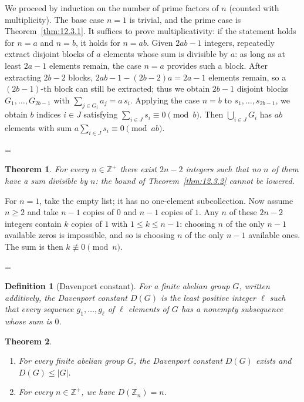 \documentclass[11pt]{article}
\makeatletter
\theoremstyle{ntstyle}
\newtheorem{theorem}{Theorem}[subsection]
\newtheorem{definition}{Definition}[subsection]
\newcommand{\statementitems}{\mbox{}}
\let\nt@closedisplay\]
\def\nt@guardedclose{\@ifnextchar\par{\nt@closeafterpar}{\@ifnextchar\end{\postdisplaypenalty\@M\nt@closedisplay}{\nt@closedisplay}}}
\def\nt@closeafterpar\par{\@ifnextchar\par{\nt@closeafterpar}{\@ifnextchar\end{\postdisplaypenalty\@M\nt@closedisplay\par}{\nt@closedisplay\par}}}
\renewenvironment{proof}[1][\proofname]{\par
  \pushQED{\qed}\normalfont\topsep\medskipamount\edef\nt@afterproof{\@endparpenalty=\the\@endparpenalty\relax}\@beginparpenalty\@M\@endparpenalty\@M\let\]\nt@guardedclose\trivlist\item[]\textit{#1\@addpunct{.}} \ignorespaces}{\ifvmode\addpenalty\@M\fi\popQED\nt@afterproof\endtrivlist\@endpefalse}
\makeatother
\begin{document}
\begin{proof} We proceed by induction on the number of prime factors of $n$ (counted with multiplicity). The base case $n = 1$ is trivial, and the
	prime case is Theorem~\ref{thm:12.3.1}. It suffices to prove multiplicativity:
	if the statement holds for $n = a$ and $n = b$, it holds for $n =
		ab$. Given $2ab - 1$ integers, repeatedly extract disjoint blocks of
	$a$ elements whose sum is divisible by $a$: as long as at least $2a -
		1$ elements remain, the case $n = a$ provides such a block. After
	extracting $2b - 2$ blocks, $2ab - 1 - (2b-2)a = 2a - 1$ elements
	remain, so a $(2b-1)$-th block can still be extracted; thus we obtain
	$2b - 1$ disjoint blocks $G_1, \ldots, G_{2b-1}$ with $\sum_{j \in
			G_i} a_j = a\, s_i$. Applying the case $n = b$ to $s_1, \ldots,
		s_{2b-1}$, we obtain $b$ indices $i \in J$ satisfying $\sum_{i \in J} s_i \equiv
		0 \pmod{b}$. Then $\bigcup_{i \in J} G_i$ has $ab$ elements with sum
	$a \sum_{i \in J} s_i \equiv 0 \pmod{ab}$.

\end{proof}
\begin{theorem}\label{thm:12.3.3} For every $n\in\mathbb{Z}^+$ there
	exist $2n - 2$ integers such that no $n$ of them have a sum divisible by $n$:
	the bound of Theorem~\ref{thm:12.3.2} cannot be lowered.

\end{theorem}

\begin{proof} For $n=1$, take the empty list; it has no one-element
	subcollection. Now assume $n\ge2$ and take $n - 1$ copies of $0$ and $n - 1$
	copies of $1$. Any $n$ of these $2n - 2$ integers contain $k$ copies
	of $1$ with $1\le k\le n - 1$: choosing $n$ of the only $n - 1$
	available zeros is impossible, and so is choosing $n$ of the only
	$n - 1$ available ones. The sum is then $k\not\equiv0\pmod{n}$.

\end{proof}
\begin{definition}[Davenport constant]\label{def:12.3.1} For a finite abelian group
	$G$, written additively, the Davenport constant $D(G)$ is the least
	positive integer $\ell$ such that every sequence $g_1, \ldots,
		g_\ell$ of $\ell$ elements of $G$ has a nonempty subsequence whose
	sum is $0$.

\end{definition}
\begin{theorem}\label{thm:12.3.4}\statementitems
	\begin{enumerate}[label={\alph*)}]
		\item For every finite abelian group $G$, the Davenport constant $D(G)$ exists and
		      $D(G)\le|G|$.
		\item For every $n\in\mathbb{Z}^+$, we have $D(\mathbb{Z}_n)=n$.
	\end{enumerate}

\end{theorem}
\end{document}
